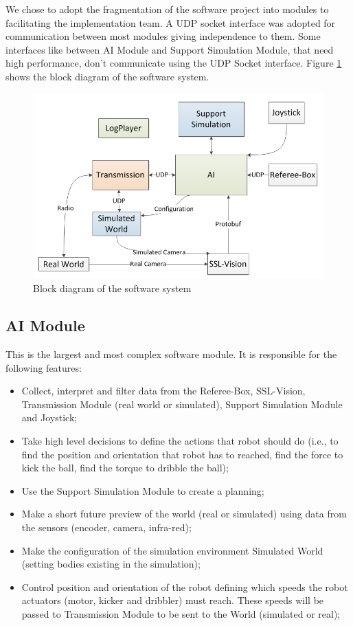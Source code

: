 \documentclass{llncs}
\begin{document}
	We chose to adopt the fragmentation of the software project into modules to facilitating
the implementation team. A UDP socket interface was adopted for communication between most modules
giving independence to them. Some interfaces like between AI Module and Support Simulation Module,
that need high performance, don't communicate using the UDP Socket interface. Figure \ref{fluxogramaSoftware}
shows the block diagram of the software system.

\begin{figure}[thpb]
     \centering
     \includegraphics[scale=0.55]{img/fluxogramaSoftware.png}
     \caption{Block diagram of the software system}
     \label{fluxogramaSoftware}
\end{figure}

\subsection{AI Module}
	This is the largest and most complex software module. It is responsible for the following features:
\begin{itemize}
\item Collect, interpret and filter data from the Referee-Box, SSL-Vision, Transmission Module (real world or simulated), Support Simulation Module and Joystick;
\item Take high level decisions to define the actions that robot should do (i.e., to find the position
and orientation that robot has to reached, find the force to kick the ball, find the torque to dribble the ball);
\item Use the Support Simulation Module to create a planning;
\item Make a short future preview of the world (real or simulated) using data from the sensors (encoder, camera, infra-red);
\item Make the configuration of the simulation environment Simulated World (setting bodies existing in the simulation);
\item Control position and orientation of the robot defining which speeds the robot actuators (motor,
kicker and dribbler) must reach. These speeds will be passed to Transmission Module to be sent to the World (simulated or real);
\end{itemize}
\end{document}
